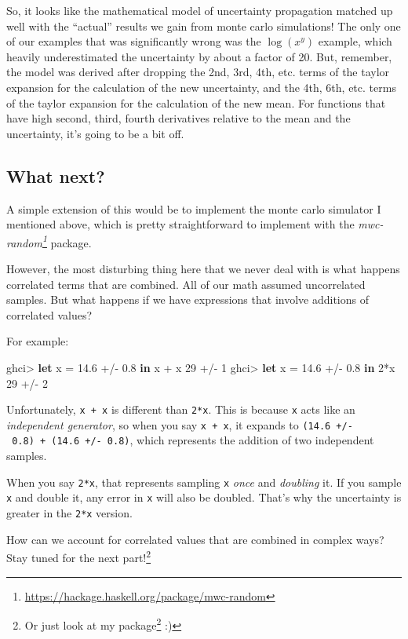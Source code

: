\documentclass[]{article}
\newenvironment{Shaded}{}{}
\newcommand{\KeywordTok}[1]{\textcolor[rgb]{0.00,0.44,0.13}{\textbf{{#1}}}}
\newcommand{\DecValTok}[1]{\textcolor[rgb]{0.25,0.63,0.44}{{#1}}}
\newcommand{\FloatTok}[1]{\textcolor[rgb]{0.25,0.63,0.44}{{#1}}}
\newcommand{\FunctionTok}[1]{\textcolor[rgb]{0.02,0.16,0.49}{{#1}}}
\newcommand{\NormalTok}[1]{{#1}}
\renewcommand{\href}[2]{#2\footnote{\url{#1}}}
\begin{document}
So, it looks like the mathematical model of uncertainty propagation
matched up well with the ``actual'' results we gain from monte carlo
simulations! The only one of our examples that was significantly wrong
was the \(\operatorname{log}(x^y)\) example, which heavily
underestimated the uncertainty by about a factor of 20. But, remember,
the model was derived after dropping the 2nd, 3rd, 4th, etc. terms of
the taylor expansion for the calculation of the new uncertainty, and the
4th, 6th, etc. terms of the taylor expansion for the calculation of the
new mean. For functions that have high second, third, fourth derivatives
relative to the mean and the uncertainty, it's going to be a bit off.

\subsection{What next?}\label{what-next}

A simple extension of this would be to implement the monte carlo
simulator I mentioned above, which is pretty straightforward to
implement with the
\emph{\href{https://hackage.haskell.org/package/mwc-random}{mwc-random}}
package.

However, the most disturbing thing here that we never deal with is what
happens correlated terms that are combined. All of our math assumed
uncorrelated samples. But what happens if we have expressions that
involve additions of correlated values?

For example:

\begin{Shaded}
\begin{Highlighting}[]
\NormalTok{ghci}\FunctionTok{>} \KeywordTok{let} \NormalTok{x }\FunctionTok{=} \FloatTok{14.6} \FunctionTok{+/-} \FloatTok{0.8} \KeywordTok{in} \NormalTok{x }\FunctionTok{+} \NormalTok{x}
\DecValTok{29} \FunctionTok{+/-} \DecValTok{1}
\NormalTok{ghci}\FunctionTok{>} \KeywordTok{let} \NormalTok{x }\FunctionTok{=} \FloatTok{14.6} \FunctionTok{+/-} \FloatTok{0.8} \KeywordTok{in} \DecValTok{2}\FunctionTok{*}\NormalTok{x}
\DecValTok{29} \FunctionTok{+/-} \DecValTok{2}
\end{Highlighting}
\end{Shaded}

Unfortunately, \texttt{x\ +\ x} is different than \texttt{2*x}. This is
because \texttt{x} acts like an \emph{independent generator}, so when
you say \texttt{x\ +\ x}, it expands to
\texttt{(14.6\ +/-\ 0.8)\ +\ (14.6\ +/-\ 0.8)}, which represents the
addition of two independent samples.

When you say \texttt{2*x}, that represents sampling \texttt{x}
\emph{once} and \emph{doubling} it. If you sample \texttt{x} and double
it, any error in \texttt{x} will also be doubled. That's why the
uncertainty is greater in the \texttt{2*x} version.

How can we account for correlated values that are combined in complex
ways? Stay tuned for the next part!\footnote{Or just look at my
  \href{https://hackage.haskell.org/package/uncertain}{package} :)}
\end{document}
